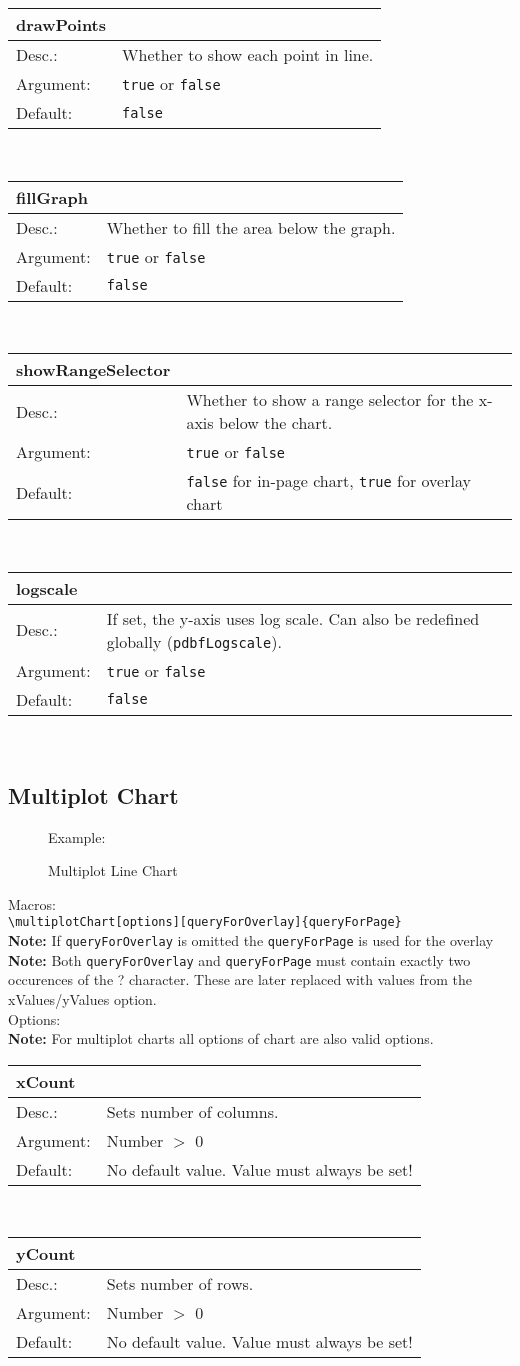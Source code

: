 \documentclass[11pt]{article}
\def\a{5cm}
\def\b{11.2cm}
\def\option#1#2#3#4{%
\noindent \begin{tabular}{|p{\a}|p{\b}|}
\hline
\textbf{#1} & \\
\hline
Desc.: & #2 \\
\hline
Argument: & #3\\
\hline
Default:& #4\\
\hline
\end{tabular} \\[4pt]%
}
\begin{document}
\option
{drawPoints}
{Whether to show each point in line.}
{\texttt{true} or \texttt{false}}
{\texttt{false}}

\option
{fillGraph}
{Whether to fill the area below the graph.}
{\texttt{true} or \texttt{false}}
{\texttt{false}}

\option
{showRangeSelector}
{Whether to show a range selector for the x-axis below the chart.}
{\texttt{true} or \texttt{false}}
{\texttt{false} for in-page chart, \texttt{true} for overlay chart}

\option
{logscale}
{If set, the y-axis uses log scale. Can also be redefined globally (\texttt{pdbfLogscale}).}
{\texttt{true} or \texttt{false}}
{\texttt{false}}

%
%

\subsection{Multiplot Chart}
\begin{figure}[h!]%
    Example:\\
    \caption{Multiplot Line Chart}
\end{figure}

\noindent Macros: \\[3pt]
\verb|\multiplotChart[options][queryForOverlay]{queryForPage}| \\
\textbf{Note:} If \verb|queryForOverlay| is omitted the \verb|queryForPage| is used for the overlay\\
\textbf{Note:} Both \verb|queryForOverlay| and \verb|queryForPage| must contain exactly two occurences of the ? character. These are later replaced with values from the xValues/yValues option.\\[8pt]
\noindent Options: \\[3pt]
%
\textbf{Note:} For multiplot charts all options of chart are also valid options.\\[4pt]
%
\option
{xCount}
{Sets number of columns.}
{Number $>$ 0}
{No default value. Value must always be set!}

\option
{yCount}
{Sets number of rows.}
{Number $>$ 0}
{No default value. Value must always be set!}
\end{document}
